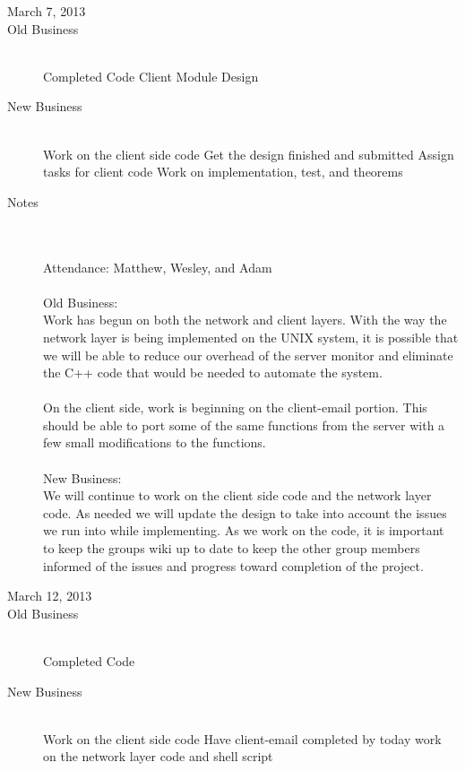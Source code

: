 \documentclass[11pt, letterpaper]{report}
\begin{document}
\begin{description}
\newpage
\item[\Large March 7, 2013]
\hypertarget{March 7, 2013} {}
\item[Old Business] \hfill \\
\subitem Completed Code
\subitem Client Module Design
\item[New Business] \hfill \\
\subitem Work on the client side code
\subsubitem Get the design finished and submitted
\subsubitem Assign tasks for client code
\subsubitem Work on implementation, test, and theorems

\item[Notes] \hfill \\ \hfill \\
Attendance:  Matthew, Wesley, and Adam\\ \\
Old Business: \\
Work has begun on both the network and client layers. With the way the network layer is being implemented on the UNIX system, it is possible that we will be able to reduce our overhead of the server monitor and eliminate the C++ code that would be needed to automate the system. \\ \\
On the client side, work is beginning on the client-email portion. This should be able to port some of the same functions from the server with a few small modifications to the functions. 
\\ \\
New Business:\\
We will continue to work on the client side code and the network layer code. As needed we will update the design to take into account the issues we run into while implementing. As we work on the code, it is important to keep the groups wiki up to date to keep the other group members informed of the issues and progress toward completion of the project.


\newpage
\item[\Large March 12, 2013]
\hypertarget{March 12, 2013} {}
\item[Old Business] \hfill \\
\subitem Completed Code
\item[New Business] \hfill \\
\subitem Work on the client side code
\subsubitem Have client-email completed by today
\subitem work on the network layer code and shell script


\end{description}
\end{document}

